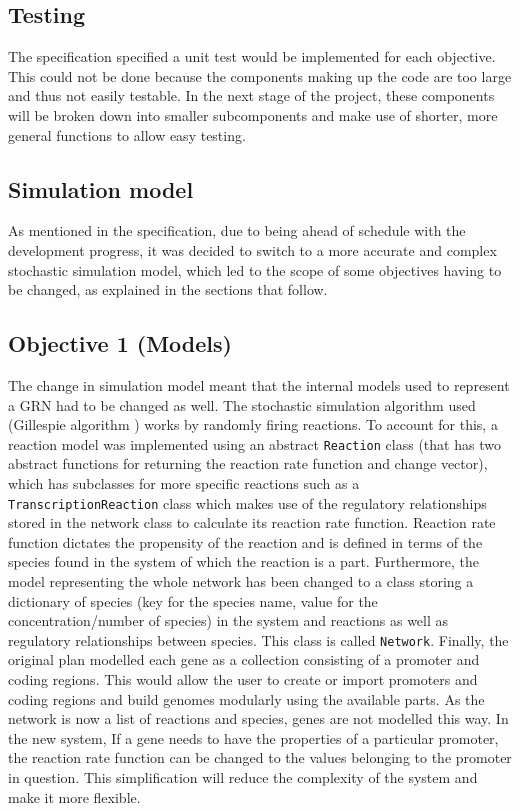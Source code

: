 \documentclass{article}
\begin{document}
	\subsection{Testing} \label{progress-testing}
	The specification specified a unit test would be implemented for each objective. This could not be done because the components making up the code are too large and thus not easily testable. In the next stage of the project, these components will be broken down into smaller subcomponents and make use of shorter, more general functions to allow easy testing.
	
	
	\subsection{Simulation model} \label{sim-model}
	As mentioned in the specification, due to being ahead of schedule with the development progress, it was decided to switch to a more accurate and complex stochastic simulation model, which led to the scope of some objectives having to be changed, as explained in the sections that follow.
	
	\subsection{Objective 1 (Models)}  
	The change in simulation model meant that the internal models used to represent a GRN had to be changed as well. The stochastic simulation algorithm used (Gillespie algorithm \cite{gillespie_original}) works by randomly firing reactions. To account for this, a reaction model was implemented using an abstract \verb|Reaction| class (that has two abstract functions for returning the reaction rate function and change vector), which has subclasses for more specific reactions such as a \verb|TranscriptionReaction| class which makes use of the regulatory relationships stored in the network class to calculate its reaction rate function. Reaction rate function dictates the propensity of the reaction and is defined in terms of the species found in the system of which the reaction is a part. Furthermore, the model representing the whole network has been changed to a class storing a dictionary of species (key for the species name, value for the concentration/number of species) in the system and reactions as well as regulatory relationships between species. This class is called \verb|Network|. Finally, the original plan modelled each gene as a collection consisting of a promoter and coding regions. This would allow the user to create or import promoters and coding regions and build genomes modularly using the available parts. As the network is now a list of reactions and species, genes are not modelled this way. In the new system, If a gene needs to have the properties of a particular promoter, the reaction rate function can be changed to the values belonging to the promoter in question. This simplification will reduce the complexity of the system and make it more flexible.
	
\end{document}
